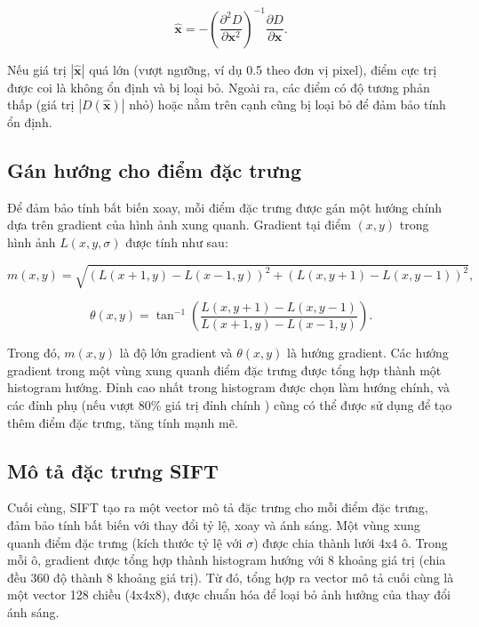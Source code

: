 \begin{equation}
\hat{\mathbf{x}} = -\left( \frac{\partial^2 D}{\partial \mathbf{x}^2} \right)^{-1} \frac{\partial D}{\partial \mathbf{x}}.
\end{equation}

Nếu giá trị $|\hat{\mathbf{x}}|$ quá lớn (vượt ngưỡng, ví dụ 0.5 theo đơn vị pixel), điểm cực trị được coi là không ổn định và bị loại bỏ. Ngoài ra, các điểm có độ tương phản thấp (giá trị $|D(\hat{\mathbf{x}})|$ nhỏ) hoặc nằm trên cạnh cũng bị loại bỏ để đảm bảo tính ổn định.

\subsection{Gán hướng cho điểm đặc trưng}

Để đảm bảo tính bất biến xoay, mỗi điểm đặc trưng được gán một hướng chính dựa trên gradient của hình ảnh xung quanh. Gradient tại điểm $(x, y)$ trong hình ảnh $L(x, y, \sigma)$ được tính như sau:

\begin{equation}
m(x, y) = \sqrt{\left( L(x+1, y) - L(x-1, y) \right)^2 + \left( L(x, y+1) - L(x, y-1) \right)^2},
\end{equation}

\begin{equation}
\theta(x, y) = \tan^{-1} \left( \frac{L(x, y+1) - L(x, y-1)}{L(x+1, y) - L(x-1, y)} \right).
\end{equation}

Trong đó, $m(x, y)$ là độ lớn gradient và $\theta(x, y)$ là hướng gradient. Các hướng gradient trong một vùng xung quanh điểm đặc trưng được tổng hợp thành một histogram hướng. Đỉnh cao nhất trong histogram được chọn làm hướng chính, và các đỉnh phụ (nếu vượt 80\% giá trị đỉnh chính \cite{Lowe04Distinctive}) cũng có thể được sử dụng để tạo thêm điểm đặc trưng, tăng tính mạnh mẽ.

\subsection{Mô tả đặc trưng SIFT}

Cuối cùng, SIFT tạo ra một vector mô tả đặc trưng cho mỗi điểm đặc trưng, đảm bảo tính bất biến với thay đổi tỷ lệ, xoay và ánh sáng. Một vùng xung quanh điểm đặc trưng (kích thước tỷ lệ với $\sigma$) được chia thành lưới 4x4 ô. Trong mỗi ô, gradient được tổng hợp thành histogram hướng với 8 khoảng giá trị (chia đều 360 độ thành 8 khoảng giá trị). Từ đó, tổng hợp ra vector mô tả cuối cùng là một vector 128 chiều (4x4x8), được chuẩn hóa để loại bỏ ảnh hưởng của thay đổi ánh sáng.

